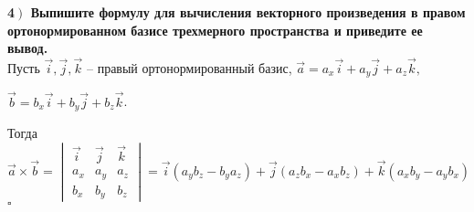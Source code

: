 \documentclass[a4paper,12pt]{article}
\begin{document}
    \textbf{4$\left.\right)$ Выпишите формулу для вычисления векторного произведения в правом ортонормированном базисе трехмерного пространства и приведите ее вывод.}\\Пусть $\overrightarrow{i}, \overrightarrow{j}, \overrightarrow{k}$ -- правый ортонормированный базис, $\overrightarrow{a}=a_x\overrightarrow{i}+a_y\overrightarrow{j}+a_z\overrightarrow{k},$

    $ \overrightarrow{b}=b_x\overrightarrow{i}+b_y\overrightarrow{j}+b_z\overrightarrow{k}$.

    Тогда $\overrightarrow{a}\times\overrightarrow{b}=\begin{vmatrix}
                                                          \overrightarrow{i} & \overrightarrow{j} & \overrightarrow{k} \\
                                                          a_x                & a_y                & a_z                \\
                                                          b_x                & b_y                & b_z
    \end{vmatrix}=\overrightarrow{i}(a_yb_z-b_ya_z)+\overrightarrow{j}(a_zb_x-a_xb_z)+\overrightarrow{k}(a_xb_y-a_yb_x)$\\
    $\square$\\
\end{document}
